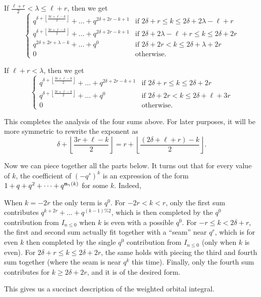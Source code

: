 \begin{itemize}
\begin{itemize}
    \ii If $\frac{\ell+r}{2} < \lambda \le \ell + r$, then we get
    \[
      \begin{cases}
        q^{\delta+\left\lfloor\frac{3r+\ell-k}{2}\right\rfloor} + \dots + q^{2\delta+2r-k+1}
          & \text{if } 2\delta+r \le k \le 2\delta+2\lambda-\ell+r  \\
        q^{\delta+\left\lfloor\frac{3r+\ell-k}{2}\right\rfloor} + \dots + q^{2\delta+2r-k+1}
          & \text{if } 2\delta+2\lambda-\ell+r \le k \le 2\delta+2r  \\
        q^{2\delta+2r+\lambda-k} + \dots + q^0
          & \text{if } 2\delta+2r < k \le 2\delta+\lambda+2r \\
        0 & \text{otherwise}.
      \end{cases}
    \]

    \ii If $\ell+r < \lambda$, then we get
    \[
      \begin{cases}
        q^{\delta+\left\lfloor\frac{3r+\ell-k}{2}\right\rfloor} + \dots + q^{2\delta+2r-k+1}
          & \text{if } 2\delta+r \le k \le 2\delta+2r \\
        q^{\delta+\left\lfloor\frac{3r+\ell-k}{2}\right\rfloor} + \dots + q^{0}
          & \text{if } 2\delta+2r < k \le 2\delta+\ell+3r \\
        0 & \text{otherwise}.
      \end{cases}
    \]
  \end{itemize}
\end{itemize}
This completes the analysis of the four sums above.
For later purposes, it will be more symmetric to rewrite the exponent as
\[ \delta + \left\lfloor \frac{3r+\ell-k}{2} \right\rfloor
  = r + \left\lfloor \frac{(2\delta+\ell+r)-k}{2} \right\rfloor. \]

Now we can piece together all the parts below.
It turns out that for every value of $k$,
the coefficient of $(-q^s)^k$ is an expression
of the form $1 + q + q^2 + \dots + q^{\mathbf n_\gamma(k)}$ for some $k$.
Indeed,
\begin{itemize}
  \ii When $k = -2r$ the only term is $q^0$.
  \ii For $-2r < k < r$, only the first sum contributes
  $q^{k+2r} + \dots + q^{(k-1)\%2}$,
  which is then completed by the $q^0$ contribution from $I_{n \le 0}$ when $k$ is even
  with a possible $q^0$.
  \ii For $-r \le k < 2\delta+r$,
  the first and second sum actually fit together with a ``seam'' near $q^r$,
  which is for even $k$ then completed by
  the single $q^0$ contribution from $I_{n \le 0}$ (only when $k$ is even).
  \ii For $2\delta+r \le k \le 2\delta+2r$,
  the same holds with piecing the third and fourth sum together
  (where the seam is near $q^k$ this time).
  \ii Finally, only the fourth sum contributes for $k \ge 2\delta+2r$,
  and it is of the desired form.
\end{itemize}
This gives us a succinct description of the weighted orbital integral.

